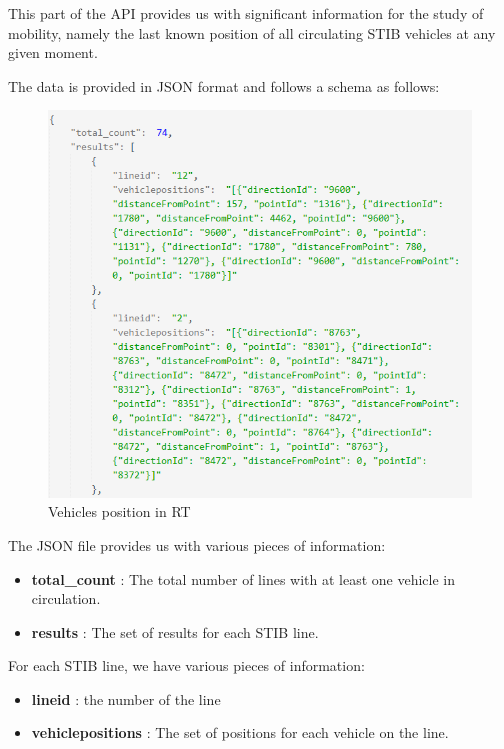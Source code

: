 \documentclass[12pt]{report}
\begin{document}
	This part of the API provides us with significant information for the study of mobility, namely the last known position of all circulating STIB vehicles at any given moment. 
	
	The data is provided in JSON format and follows a schema as follows:
	
	\begin{figure}
		\centering
		\includegraphics[width=\textwidth]{images/RTResponseJson}
		\caption{Vehicles position in RT}
		\label{RT_Position_content}
	\end{figure}
	
	
	The JSON file provides us with various pieces of information:
	
	\begin{center}
		\begin{itemize}[noitemsep]
			\item \textbf{total\_count} : The total number of lines with at least one vehicle in circulation.
			\item \textbf{results} : The set of results for each STIB line.
		\end{itemize}
	\end{center}
	
	
	For each STIB line, we have various pieces of information:
	
	\begin{center}
		\begin{itemize}[noitemsep]
			\item \textbf{lineid} : the number of the line
			\item \textbf{vehiclepositions} : The set of positions for each vehicle on the line.
		\end{itemize}
	\end{center}
	
\end{document}
